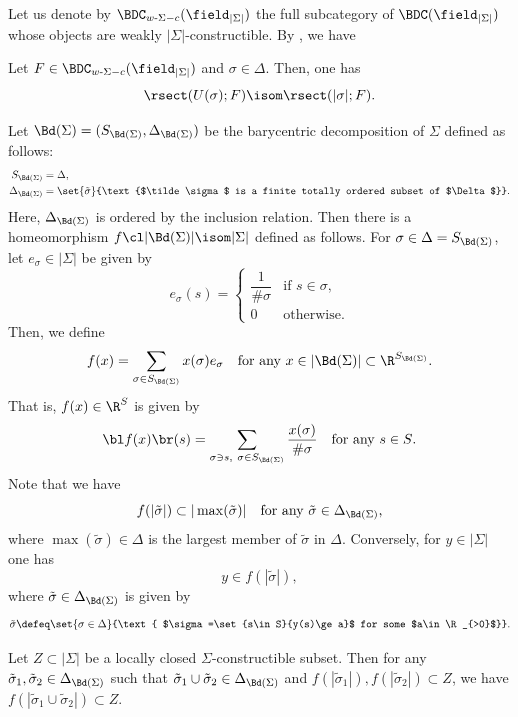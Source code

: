 Let us denote by $\BDC_{w\text-\Sigma-c}(\field_{|\Sigma|})$ the full subcategory of $\BDC(\field_{|\Sigma|})$ whose objects are weakly $|\Sigma|$-constructible.
By \cite[Prop.\,8.1.4]{KS90}, we have

\begin{lemma} \label{lem:Usigma}
Let $F\in\BDC_{w\text-\Sigma-c}(\field_{|\Sigma|})$ and $\sigma\in\Delta$. Then, one has
\[\rsect(U(\sigma);F)\isom\rsect(|\sigma|;F).\]
\end{lemma}

Let $\Bd(\Sigma)=(S_{\Bd(\Sigma)}, \Delta_{\Bd(\Sigma)})$ be the barycentric
decomposition of $\Sigma$ defined as follows:
\begin{align*}
S_{\Bd(\Sigma)}&=\Delta,\\
\Delta_{\Bd(\Sigma)}&=\set{\tilde\sigma}
{\text{$\tilde\sigma$ is a finite totally ordered subset of $\Delta$}}.
\end{align*}
Here, $\Delta_{\Bd(\Sigma)}$ is ordered by the inclusion relation.
Then there is a homeomorphism
$f\cl|\Bd(\Sigma)|\isom |\Sigma|$
defined as follows.
For $\sigma\in\Delta=S_{\Bd(\Sigma)}$, let $e_\sigma\in|\Sigma|$ be given by
\[e_\sigma(s)=
\begin{cases}
\dfrac{1}{\#\sigma}&\text{if $s\in\sigma$,}\\[1ex]
0&\text{otherwise.}
\end{cases}
\]
Then, we define\vspace*{-3pt}
\[
f(x)=\sum_{\sigma\in S_{\Bd(\Sigma)}}x(\sigma)e_{\sigma}
\quad\text{for any $x\in |\Bd(\Sigma)|\subset\R^{S_{\Bd(\Sigma)}}$.}
\]
That is, $f(x)\in\R^S$ is given by\vspace*{-3pt}
\[
\bl f(x)\br(s)=\sum_{\sigma\owns s,\ \sigma\in S_{\Bd(\Sigma)}}\dfrac{x(\sigma)}{\#\sigma}
\quad\text{for any $s\in S$.}
\]
Note that we have\vspace*{-3pt}
\begin{equation}
f(|\tilde\sigma|)\subset |\max(\tilde\sigma)|\quad\text{for any $\tilde\sigma\in \Delta_{\Bd(\Sigma)}$,}\label{eq:bary}
\end{equation}
where $\max(\tilde\sigma)\in\Delta$ is the largest member of $\tilde\sigma$ in $\Delta$.
Conversely, for $y\in|\Sigma|$ one has\vspace*{-3pt}
\[y\in f(|\tilde\sigma|),\]
where $\tilde\sigma\in\Delta_{\Bd(\Sigma)}$ is given by
\[\tilde\sigma\defeq\set{\sigma\in\Delta}{\text{
$\sigma=\set{s\in S}{y(s)\ge a}$
for some $a\in\R_{>0}$}}.\]

\begin{lemma}\label{sublemma}
Let $Z\subset|\Sigma|$ be a locally closed $\Sigma$-constructible subset.
Then for any
$\tilde\sigma_1,\tilde\sigma_2\in \Delta_{\Bd(\Sigma)}$ such that
$\tilde\sigma_1\cup\tilde\sigma_2\in\Delta_{\Bd(\Sigma)}$ and
$f(|\tilde\sigma_1|),f(|\tilde\sigma_2|)\subset Z$,
we have
\hbox{$f(|\tilde\sigma_1\cup\tilde\sigma_2|)\subset Z$}.
\end{lemma}

